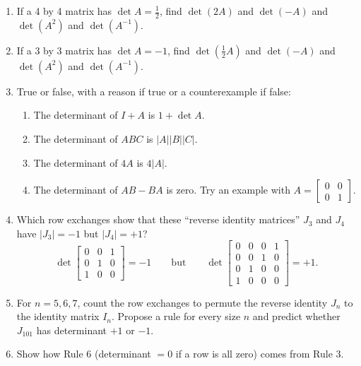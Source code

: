\documentclass[14pt, a4paper]{article}
\begin{document}
\begin{enumerate}
    \item If a 4 by 4 matrix has $\det A = \frac{1}{2}$, find $\det(2A)$ and $\det(-A)$ and $\det(A^2)$ and $\det(A^{-1})$.

    \item If a 3 by 3 matrix has $\det A = -1$, find $\det(\frac{1}{2}A)$ and $\det(-A)$ and $\det(A^2)$ and $\det(A^{-1})$.

    \item True or false, with a reason if true or a counterexample if false:
          \begin{enumerate}
              \item The determinant of $I + A$ is $1 + \det A$.
              \item The determinant of $ABC$ is $|A||B||C|$.
              \item The determinant of $4A$ is $4|A|$.
              \item The determinant of $AB - BA$ is zero. Try an example with $A = \begin{bmatrix} 0 & 0 \\ 0 & 1 \end{bmatrix}$.
          \end{enumerate}

    \item Which row exchanges show that these ``reverse identity matrices'' $J_3$ and $J_4$ have $|J_3| = -1$ but $|J_4| = +1$?
          \[
              \det \begin{bmatrix} 0 & 0 & 1 \\ 0 & 1 & 0 \\ 1 & 0 & 0 \end{bmatrix} = -1 \qquad \text{but} \qquad \det \begin{bmatrix} 0 & 0 & 0 & 1 \\ 0 & 0 & 1 & 0 \\ 0 & 1 & 0 & 0 \\ 1 & 0 & 0 & 0 \end{bmatrix} = +1.
          \]

    \item For $n = 5, 6, 7$, count the row exchanges to permute the reverse identity $J_n$ to the identity matrix $I_n$. Propose a rule for every size $n$ and predict whether $J_{101}$ has determinant $+1$ or $-1$.

    \item Show how Rule 6 (determinant $= 0$ if a row is all zero) comes from Rule 3.


\end{enumerate}
\end{document}
